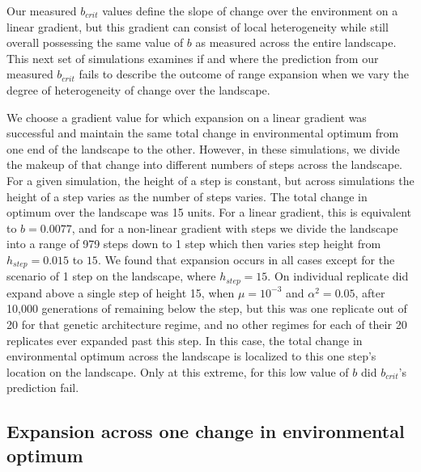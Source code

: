 Our measured $b_{crit}$ values define the slope of change over the environment on a linear gradient, but this gradient can consist of local heterogeneity while still overall possessing the same value of $b$ as measured across the entire landscape. This next set of simulations examines if and where the prediction from our measured $b_{crit}$ fails to describe the outcome of range expansion when we vary the degree of heterogeneity of change over the landscape. 

We choose a gradient value for which expansion on a linear gradient was successful and maintain the same total change in environmental optimum from one end of the landscape to the other. However, in these simulations, we divide the makeup of that change into different numbers of steps across the landscape. For a given simulation, the height of a step is constant, but across simulations the height of a step varies as the number of steps varies. The total change in optimum over the landscape was 15 units. For a linear gradient, this is equivalent to $b = 0.0077$, and for a non-linear gradient with steps we divide the landscape into a range of 979 steps down to 1 step which then varies step height from $h_{step} = 0.015$ to $15$. We found that expansion occurs in all cases except for the scenario of 1 step on the landscape, where $h_{step} = 15$. On individual replicate did expand above a single step of height 15, when $\mu = 10^{-3}$ and $\alpha^2 = 0.05$, after 10,000 generations of remaining below the step, but this was one replicate out of 20 for that genetic architecture regime, and no other regimes for each of their 20 replicates ever expanded past this step. In this case, the total change in environmental optimum across the landscape is localized to this one step's location on the landscape. Only at this extreme, for this low value of $b$ did $b_{crit}$'s prediction fail. %


\subsection{Expansion across one change in environmental optimum}

